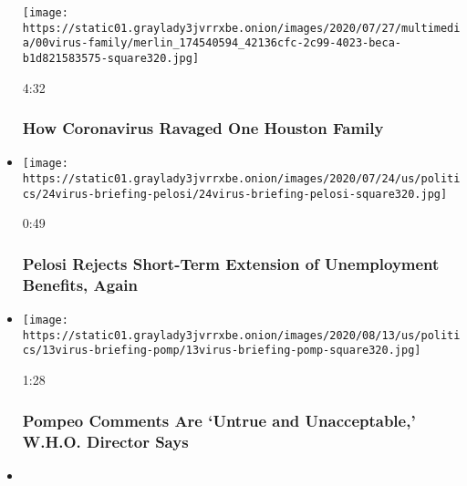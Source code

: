 \begin{itemize}
  \texttt{[image: https://static01.graylady3jvrrxbe.onion/images/2020/07/27/multimedia/00virus-family/merlin\_174540594\_42136cfc-2c99-4023-beca-b1d821583575-square320.jpg]}

  4:32

  \hypertarget{how-coronavirus-ravaged-one-houston-family}{%
  \subsubsection{How Coronavirus Ravaged One Houston
  Family}\label{how-coronavirus-ravaged-one-houston-family}}
\item
  \href{https://www.nytimes3xbfgragh.onion/video/us/100000007256158/pelosi-rejects-unemployment-extension.html?action=click\&module=video-series-bar\&region=header\&pgtype=Article\&playlistId=video/coronavirus-news-update}{}

  \texttt{[image: https://static01.graylady3jvrrxbe.onion/images/2020/07/24/us/politics/24virus-briefing-pelosi/24virus-briefing-pelosi-square320.jpg]}

  0:49

  \hypertarget{pelosi-rejects-short-term-extension-of-unemployment-benefits-again}{%
  \subsubsection{Pelosi Rejects Short-Term Extension of Unemployment
  Benefits,
  Again}\label{pelosi-rejects-short-term-extension-of-unemployment-benefits-again}}
\item
  \href{https://www.nytimes3xbfgragh.onion/video/world/100000007253595/world-health-organization-pompeo-china.html?action=click\&module=video-series-bar\&region=header\&pgtype=Article\&playlistId=video/coronavirus-news-update}{}

  \texttt{[image: https://static01.graylady3jvrrxbe.onion/images/2020/08/13/us/politics/13virus-briefing-pomp/13virus-briefing-pomp-square320.jpg]}

  1:28

  \hypertarget{pompeo-comments-are-untrue-and-unacceptable-who-director-says}{%
  \subsubsection{Pompeo Comments Are `Untrue and Unacceptable,' W.H.O.
  Director
  Says}\label{pompeo-comments-are-untrue-and-unacceptable-who-director-says}}
\item
  \href{https://www.nytimes3xbfgragh.onion/video/us/politics/100000007253264/obama-biden-conversation.html?action=click\&module=video-series-bar\&region=header\&pgtype=Article\&playlistId=video/coronavirus-news-update}{}


\end{itemize}
